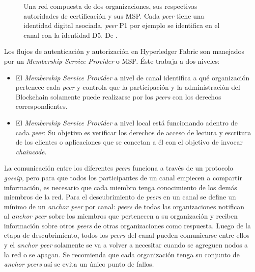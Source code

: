 \begin{figure}[H]
    \caption{Una red compuesta de dos organizaciones, sus respectivas autoridades de certificación y sus MSP. Cada \textit{peer} tiene una identidad digital asociada, \textit{peer} P1 por ejemplo se identifica en el canal con la identidad D5. De \cite{hlf-peers}.}
    \label{fig:identidad}
\end{figure}

Los flujos de autenticación y autorización en Hyperledger Fabric son manejados por un \textit{Membership Service Provider} o MSP. Éste trabaja a dos niveles:
\begin{itemize}
    \item El \textit{Membership Service Provider} a nivel de canal identifica a qué organización pertenece cada \textit{
    peer} y controla que la participación y la administración del Blockchain solamente puede realizarse por los \textit{peers}  con los derechos correspondientes.
    \item El \textit{Membership Service Provider} a nivel local está funcionando adentro de cada \textit{peer}: Su objetivo es verificar los derechos de acceso de lectura y escritura de los clientes o aplicaciones que se conectan a él con el objetivo de invocar \textit{chaincode}. 
\end{itemize}

La comunicación entre los diferentes \textit{peers}  funciona a través de un protocolo \textit{gossip}, pero para que todos los participantes de un canal empiecen a compartir información, es necesario que cada miembro tenga conocimiento de los demás miembros de la red. Para el descubrimiento de \textit{peers}  en un canal se define un mínimo de un \textit{anchor peer} por canal: \textit{peers}  de todas las organizaciones notifican al \textit{anchor peer} sobre los miembros que pertenecen a su organización y reciben información sobre otros \textit{peers}  de otras organizaciones como respuesta. Luego de la etapa de descubrimiento, todos los \textit{peers}  del canal pueden comunicarse entre ellos y el \textit{anchor peer} solamente se va a volver a necesitar cuando se agreguen nodos a la red o se apagan. Se recomienda que cada organización tenga su conjunto de \textit{anchor peers} así se evita un único punto de fallos.

